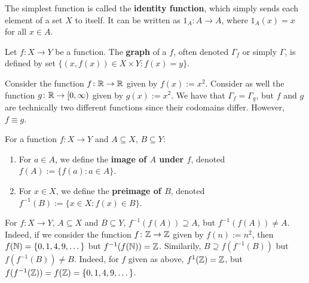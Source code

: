 \begin{example}
   The simplest function is called the \textbf{identity function}, which simply sends each element of a set $X$ to itself. It can be written as $1_A \colon A \to A$, where $1_A(x) = x$ for all $x \in A$. 
\end{example}

\begin{defbox}
   Let $f \colon X \to Y$ be a function. The \textbf{graph} of a $f$, often denoted $\Gamma_f$ or simply $\Gamma$, is defined by set $\{(x, f(x)) \in X \times Y \colon f(x) = y\}$.
\end{defbox}

\begin{example}
   Consider the function $f \colon \mathbb{R} \to \mathbb{R}$ given by $f(x) := x^2$. Consider as well the function $g \colon \mathbb{R} \to [0, \infty)$ given by $g(x) := x^2$. We have that $\Gamma_f = \Gamma_g$, but $f$ and $g$ are technically two different functions since their codomains differ. However, $f \equiv g$. 
\end{example}

\begin{defbox}
   For a function $f \colon X \to Y$ and $A \subseteq X$, $B \subseteq Y$:
   \begin{enumerate}
      \item For $a \in A$, we define the \textbf{image of $A$ under $f$}, denoted $f(A) := \{f(a) \colon a \in A\}$. 
      \item For $x \in X$, we define the \textbf{preimage of $B$}, denoted $f^{-1}(B) := \{x \in X \colon f(x) \in B\}$. 
   \end{enumerate}
\end{defbox}

\begin{remark}
   For $f \colon X \to Y$, $A \subseteq X$ and $B \subseteq Y$, $f^{-1}(f(A)) \supseteq A$, but $f^{-1}(f(A)) \neq A$. Indeed, if we consider the function $f \colon \mathbb{Z} \to \mathbb{Z}$ given by $f(n) := n^2$, then $f(\mathbb{N}) = \{0, 1, 4, 9, \dots\}$ but $f^{-1}(f(\mathbb{N})) = \mathbb{Z}$. 
   Similarily, $B \supseteq f(f^{-1}(B))$ but $f(f^{-1}(B)) \neq B$. Indeed, for $f$ given as above, $f^{1}(\mathbb{Z}) = \mathbb{Z}$, but $f(f^{-1}(\mathbb{Z})) = f(\mathbb{Z}) = \{0, 1, 4, 9, \dots\}$. 
\end{remark}

